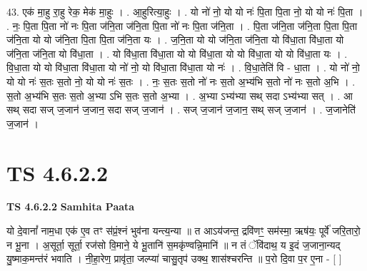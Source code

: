 \documentclass[17pt]{extarticle}
\begin{document}
43. एक॑ मा॒हु रा॒हु रेक॒ मेक॑ मा॒हुः । . आ॒हुरित्या॒हुः । . यो नो॑ नो॒ यो यो नः॑ पि॒ता पि॒ता नो॒ यो यो नः॑ पि॒ता । . नः॒ पि॒ता पि॒ता नो॑ नः पि॒ता ज॑नि॒ता ज॑नि॒ता पि॒ता नो॑ नः पि॒ता ज॑नि॒ता । . पि॒ता ज॑नि॒ता ज॑नि॒ता पि॒ता पि॒ता ज॑नि॒ता यो यो ज॑नि॒ता पि॒ता पि॒ता ज॑नि॒ता यः । . ज॒नि॒ता यो यो ज॑नि॒ता ज॑नि॒ता यो वि॑धा॒ता वि॑धा॒ता यो ज॑नि॒ता ज॑नि॒ता यो वि॑धा॒ता । . यो वि॑धा॒ता वि॑धा॒ता यो यो वि॑धा॒ता यो यो वि॑धा॒ता यो यो वि॑धा॒ता यः । . वि॒धा॒ता यो यो वि॑धा॒ता वि॑धा॒ता यो नो॑ नो॒ यो वि॑धा॒ता वि॑धा॒ता यो नः॑ । . वि॒धा॒तेति॑ वि - धा॒ता । . यो नो॑ नो॒ यो यो नः॑ स॒तः स॒तो नो॒ यो यो नः॑ स॒तः । . नः॒ स॒तः स॒तो नो॑ नः स॒तो अ॒भ्य॑भि स॒तो नो॑ नः स॒तो अ॒भि । . स॒तो अ॒भ्य॑भि स॒तः स॒तो अ॒भ्या ऽभि स॒तः स॒तो अ॒भ्या । . अ॒भ्या ऽभ्य॑भ्या सथ् सदा ऽभ्य॑भ्या सत् । . आ सथ् सदा सज् ज॒जान॑ ज॒जान॒ सदा सज् ज॒जान॑ । . सज् ज॒जान॑ ज॒जान॒ सथ् सज् ज॒जान॑ । . ज॒जानेति॑ ज॒जान॑ । \newline
\pagebreak
{}

\section{ TS 4.6.2.2 }

\textbf{TS 4.6.2.2 } \newline
\textbf{Samhita Paata} \newline

यो दे॒वानां᳚ नाम॒धा एक॑ ए॒व तꣳ स॑प्रं॒श्नं भुव॑ना यन्त्य॒न्या ॥ त आऽय॑जन्त॒ द्रवि॑णꣳ॒॒ सम॑स्मा॒ ऋष॑यः॒ पूर्वे॑ जरि॒तारो॒ न भू॒ना । अ॒सूर्ता॒ सूर्ता॒ रज॑सो वि॒माने॒ ये भू॒तानि॑ स॒मकृ॑ण्वन्नि॒मानि॑ ॥ न तं ॅवि॑दाथ॒ य इ॒दं ज॒जाना॒न्यद् यु॒ष्माक॒मन्त॑रं भवाति । नी॒हा॒रेण॒ प्रावृ॑ता॒ जल्प्या॑ चासु॒तृप॑ उक्थ॒ शास॑श्चरन्ति ॥ प॒रो दि॒वा प॒र ए॒ना - [  ] \newline
\end{document}
